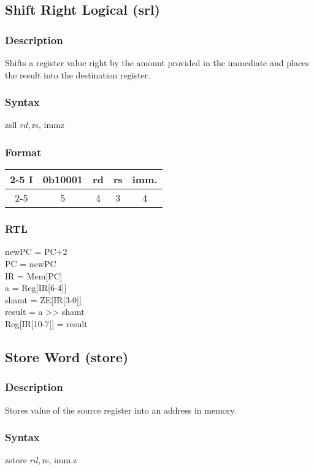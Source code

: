\documentclass[12pt, a4paper]{report}
\begin{document}
	\subsection{Shift Right Logical (srl)}
	\subsubsection{Description}
	Shifts a register value right by the amount provided in the immediate and places the result into the destination register.
	\subsubsection{Syntax}
	zsll    $rd, $rs, immz %
	\subsubsection{Format}
	\begin{center}
		{\renewcommand{\arraystretch}{1.5}
			\begin{tabular}[b]{c @{ } c | c | c | c|}
				\cline{2-5}
				I & \vline \hspace{1.5pt} 0b10001 & rd & rs & imm. \\
				\cline{2-5}
				\multicolumn{1}{}{} & \multicolumn{1}{c}{5} & \multicolumn{1}{c}{4}
				& \multicolumn{1}{c}{3} & \multicolumn{1}{c}{4}
		\end{tabular}}
	\end{center}
	\subsubsection{RTL}
	newPC = PC+2 \\
	PC = newPC \\
	IR = Mem[PC] \\
	a = Reg[IR[6-4]] \\
	shamt = ZE[IR[3-0]] \\
	result = a >> shamt \\
	Reg[IR[10-7]] = result \\
	
	\subsection{Store Word (store)}
	\subsubsection{Description}
	Stores value of the source register into an address in memory.
	\subsubsection{Syntax}
	zstore    $rd, $rs, imm.z %
\end{document}
